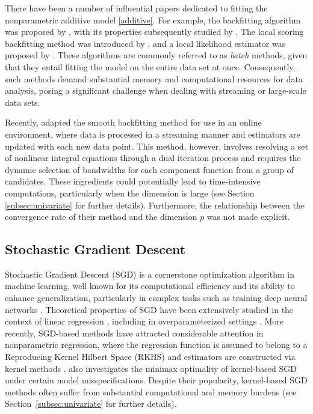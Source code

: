 There have been a number of influential papers dedicated to fitting the nonparametric additive model \eqref{additive}. For example, the backfitting algorithm was proposed by \cite{97272c9f-415d-38e1-b5c1-b5216f1a728e}, with its properties subsequently studied by \cite{7b56331a-3c32-333b-a3a9-80650cf8a6e6}. The local scoring backfitting method was introduced by \cite{hastie1990generalized}, and a local likelihood estimator was proposed by \cite{27f0e47c-7e6a-3f96-87cd-35773773c7ae}. These algorithms are commonly referred to as \textit{batch} methods, given that they entail fitting the model on the entire data set at once. Consequently, such methods demand substantial memory and computational resources for data analysis, posing a significant challenge when dealing with streaming or large-scale data sets. 

Recently, \cite{doi:10.1080/01621459.2023.2182213} adapted the smooth backfitting method \citep{40bc9d37-04e6-331a-92b0-fcf494a7785c, 29938989-35ba-3682-81ec-8d6d28e262dc} for use in an online environment, where data is processed in a streaming manner and estimators are updated with each new data point. This method, however, involves resolving a set of nonlinear integral equations through a dual iteration process and requires the dynamic selection of bandwidths for each component function from a group of candidates. These ingredients could potentially lead to time-intensive computations, particularly when the dimension is large (see Section \ref{subsec:univariate} for further details). Furthermore, the relationship between the convergence rate of their method and the dimension $p$ was not made explicit.

\subsection{Stochastic Gradient Descent}

Stochastic Gradient Descent (SGD) is a cornerstone optimization algorithm in machine learning, well known for its computational efficiency and its ability to enhance generalization, particularly in complex tasks such as training deep neural networks \citep{Goodfellow-et-al-2016}. Theoretical properties of SGD have been extensively studied in the context of linear regression \citep{jain2018parallelizing, ge2019step}, including in overparameterized settings \citep{zou2021benefits, zou2021benign, wu2022last}. More recently, SGD-based methods have attracted considerable attention in nonparametric regression, where the regression function is assumed to belong to a Reproducing Kernel Hilbert Space (RKHS) and estimators are constructed via kernel methods \citep{4406a3ce-1e59-3ed8-8c25-9f7d75b81f14, 6842642, article}. \citet{zhang2025learning} also investigates the minimax optimality of kernel-based SGD under certain model misspecifications. Despite their popularity, kernel-based SGD methods often suffer from substantial computational and memory burdens (see Section~\ref{subsec:univariate} for further details).

